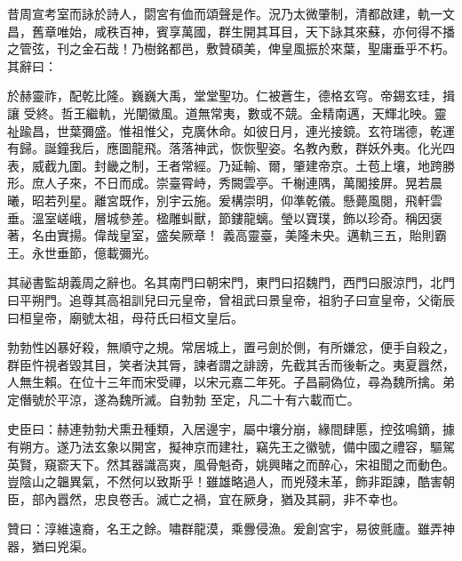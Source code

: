 \begin{pinyinscope}
 昔周宣考室而詠於詩人，閟宮有侐而頌聲是作。況乃太微肇制，清都啟建，軌一文昌，舊章唯始，咸秩百神，賓享萬國，群生開其耳目，天下詠其來蘇，亦何得不播之管弦，刊之金石哉！乃樹銘都邑，敷贊碩美，俾皇風振於來葉，聖庸垂乎不朽。其辭曰：



 於赫靈祚，配乾比隆。巍巍大禹，堂堂聖功。仁被蒼生，德格玄穹。帝錫玄珪，揖讓
 受終。哲王繼軌，光闡徽風。道無常夷，數或不競。金精南邁，天輝北映。靈祉踰昌，世葉彌盛。惟祖惟父，克廣休命。如彼日月，連光接鏡。玄符瑞德，乾運有歸。誕鐘我后，應圖龍飛。落落神武，恢恢聖姿。名教內敷，群妖外夷。化光四表，威截九圍。封畿之制，王者常經。乃延輸、爾，肇建帝京。土苞上壤，地跨勝形。庶人子來，不日而成。崇臺霄峙，秀闕雲亭。千榭連隅，萬閣接屏。晃若晨曦，昭若列星。離宮既作，別宇云施。爰構崇明，仰準乾儀。懸薨風閱，飛軒雲垂。溫室嵯峨，層城參差。楹雕虯獸，節鏤龍螭。瑩以寶璞，飾以珍奇。稱因褒著，名由實揚。偉哉皇室，盛矣厥章！
 義高靈臺，美隆未央。邁軌三五，貽則霸王。永世垂節，億載彌光。



 其祕書監胡義周之辭也。名其南門曰朝宋門，東門曰招魏門，西門曰服涼門，北門曰平朔門。追尊其高祖訓兒曰元皇帝，曾祖武曰景皇帝，祖豹子曰宣皇帝，父衛辰曰桓皇帝，廟號太祖，母苻氏曰桓文皇后。



 勃勃性凶暴好殺，無順守之規。常居城上，置弓劍於側，有所嫌忿，便手自殺之，群臣忤視者毀其目，笑者決其脣，諫者謂之誹謗，先截其舌而後斬之。夷夏囂然，人無生賴。在位十三年而宋受禪，以宋元嘉二年死。子昌嗣偽位，尋為魏所擒。弟定僭號於平涼，遂為魏所滅。自勃勃
 至定，凡二十有六載而亡。



 史臣曰：赫連勃勃犬熏丑種類，入居邊宇，屬中壤分崩，緣間肆慝，控弦鳴鏑，據有朔方。遂乃法玄象以開宮，擬神京而建社，竊先王之徽號，備中國之禮容，驅駕英賢，窺窬天下。然其器識高爽，風骨魁奇，姚興睹之而醉心，宋祖聞之而動色。豈陰山之韞異氣，不然何以致斯乎！雖雄略過人，而兇殘未革，飾非距諫，酷害朝臣，部內囂然，忠良卷舌。滅亡之禍，宜在厥身，猶及其嗣，非不幸也。



 贊曰：淳維遠裔，名王之餘。嘯群龍漠，乘釁侵漁。爰創宮宇，易彼氈廬。雖弄神器，猶曰兇渠。



\end{pinyinscope}